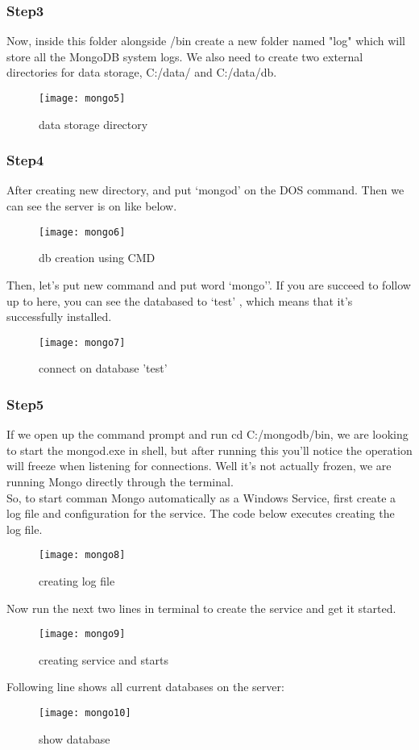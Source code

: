 \documentclass[conference,compsoc, twocolumn]{IEEEtran}
\begin{document}
\begin{itemize}
\subsubsection{Step3}
Now, inside this folder alongside /bin create a new folder named "log" which will store all the MongoDB system logs. We also need to create two external directories for data storage, C:/data/ and C:/data/db.
\begin{figure}[H]
\centering\texttt{[image: mongo5]}
\caption{data storage directory}
\end{figure}

\subsubsection{Step4}
After creating new directory, and put ‘mongod’ on the DOS command. Then we can see the server is on like below. 
\begin{figure}[H]
\centering\texttt{[image: mongo6]}
\caption{db creation using CMD}
\end{figure}
Then, let’s put new command and put word ‘mongo’’. If you are succeed to follow up to here, you can see the databased to ‘test’ , which means that it’s successfully installed.
\begin{figure}[H]
\centering\texttt{[image: mongo7]}
\caption{connect on database 'test'}
\end{figure}

\subsubsection{Step5}
If we open up the command prompt and run cd C:/mongodb/bin, we are looking to start the mongod.exe in shell, but after running this you’ll notice the operation will freeze when listening for connections. Well it’s not actually frozen, we are running Mongo directly through the terminal.\\
So, to start comman Mongo automatically as a Windows Service, first create a log file and configuration for the service. The code below executes creating the log file.
\begin{figure}[H]
\centering\texttt{[image: mongo8]}
\caption{creating log file}
\end{figure}
Now run the next two lines in terminal to create the service and get it started.
\begin{figure}[H]
\centering\texttt{[image: mongo9]}
\caption{creating service and starts}
\end{figure}
Following line shows all current databases on the server:
\begin{figure}[H]
\centering\texttt{[image: mongo10]}
\caption{show database}
\end{figure}



\end{itemize}
\end{document}
